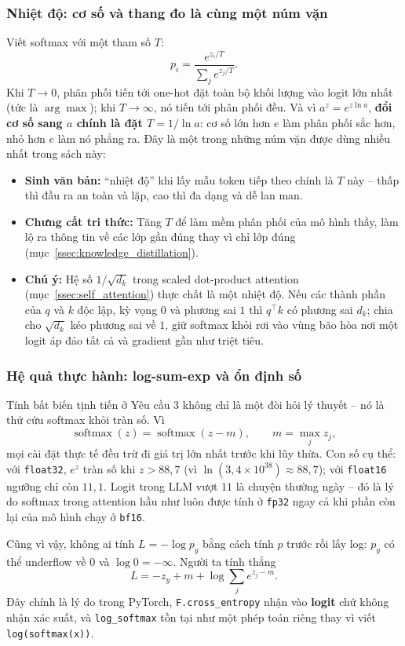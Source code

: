 \subsubsection{Nhiệt độ: cơ số và thang đo là cùng một núm vặn}
Viết softmax với một tham số $T$:
\[
p_i = \frac{e^{z_i / T}}{\sum_j e^{z_j / T}} .
\]
Khi $T \to 0$, phân phối tiến tới one-hot đặt toàn bộ khối lượng vào logit lớn nhất (tức là $\arg\max$); khi $T \to \infty$, nó tiến tới phân phối đều. Và vì $a^z = e^{z \ln a}$, \textbf{đổi cơ số sang $a$ chính là đặt $T = 1/\ln a$}: cơ số lớn hơn $e$ làm phân phối sắc hơn, nhỏ hơn $e$ làm nó phẳng ra. Đây là một trong những núm vặn được dùng nhiều nhất trong sách này:
\begin{itemize}
    \item \textbf{Sinh văn bản:} “nhiệt độ” khi lấy mẫu token tiếp theo chính là $T$ này -- thấp thì đầu ra an toàn và lặp, cao thì đa dạng và dễ lan man.
    \item \textbf{Chưng cất tri thức:} Tăng $T$ để làm mềm phân phối của mô hình thầy, làm lộ ra thông tin về các lớp gần đúng thay vì chỉ lớp đúng (mục~\ref{ssec:knowledge_distillation}).
    \item \textbf{Chú ý:} Hệ số $1/\sqrt{d_k}$ trong scaled dot-product attention (mục~\ref{ssec:self_attention}) thực chất là một nhiệt độ. Nếu các thành phần của $q$ và $k$ độc lập, kỳ vọng $0$ và phương sai $1$ thì $q^\top k$ có phương sai $d_k$; chia cho $\sqrt{d_k}$ kéo phương sai về $1$, giữ softmax khỏi rơi vào vùng bão hòa nơi một logit áp đảo tất cả và gradient gần như triệt tiêu.
\end{itemize}

\subsubsection{Hệ quả thực hành: log-sum-exp và ổn định số}
Tính bất biến tịnh tiến ở Yêu cầu 3 không chỉ là một đòi hỏi lý thuyết -- nó là thứ cứu softmax khỏi tràn số. Vì
\[
\operatorname{softmax}(z) = \operatorname{softmax}(z - m), \qquad m = \max_j z_j ,
\]
mọi cài đặt thực tế đều trừ đi giá trị lớn nhất trước khi lũy thừa. Con số cụ thể: với \texttt{float32}, $e^z$ tràn số khi $z > 88{,}7$ (vì $\ln(3{,}4 \times 10^{38}) \approx 88{,}7$); với \texttt{float16} ngưỡng chỉ còn $11{,}1$. Logit trong LLM vượt $11$ là chuyện thường ngày -- đó là lý do softmax trong attention hầu như luôn được tính ở \texttt{fp32} ngay cả khi phần còn lại của mô hình chạy ở \texttt{bf16}.

Cũng vì vậy, không ai tính $L = -\log p_y$ bằng cách tính $p$ trước rồi lấy log: $p_y$ có thể underflow về $0$ và $\log 0 = -\infty$. Người ta tính thẳng
\[
L = -z_y + m + \log \sum_j e^{z_j - m} .
\]
Đây chính là lý do trong PyTorch, \texttt{F.cross\_entropy} nhận vào \textbf{logit} chứ không nhận xác suất, và \texttt{log\_softmax} tồn tại như một phép toán riêng thay vì viết \texttt{log(softmax(x))}.

